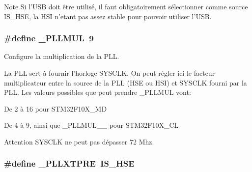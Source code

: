 \begin{DoxyNote}{Note}
Si l'U\+S\+B doit être utilisé, il faut obligatoirement sélectionner comme source I\+S\+\_\+\+H\+S\+E, la H\+S\+I n'etant pas assez stable pour pouvoir utiliser l'U\+S\+B. 
\end{DoxyNote}
\hypertarget{group__conf___c_l_o_c_k_ga60db718f30be6916848275c17fa93121}{
\subsubsection[{\+\_\+\+P\+L\+L\+M\+U\+L}]{\setlength{\rightskip}{0pt plus 5cm}\#define \+\_\+\+P\+L\+L\+M\+U\+L~9}}\label{group__conf___c_l_o_c_k_ga60db718f30be6916848275c17fa93121}


Configure la multiplication de la P\+L\+L. 

La P\+L\+L sert à fournir l'horloge S\+Y\+S\+C\+L\+K. On peut régler ici le facteur multiplicateur entre la source de la P\+L\+L (H\+S\+E ou H\+S\+I) et S\+Y\+S\+C\+L\+K fourni par la P\+L\+L. Les valeurs possibles que peut prendre \+\_\+\+P\+L\+L\+M\+U\+L vont\+:
\begin{DoxyItemize}
\item De 2 à 16 pour S\+T\+M32\+F10\+X\+\_\+\+M\+D
\item De 4 à 9, ainsi que \+\_\+\+P\+L\+L\+M\+U\+L\+\_\+\_ pour S\+T\+M32\+F10\+X\+\_\+\+C\+L
\end{DoxyItemize}

\begin{DoxyAttention}{Attention}
S\+Y\+S\+C\+L\+K ne peut pas dépasser 72 Mhz. 
\end{DoxyAttention}
\hypertarget{group__conf___c_l_o_c_k_gaa1260de2fa33a5a6d4a7be72132f3049}{
\subsubsection[{\+\_\+\+P\+L\+L\+X\+T\+P\+R\+E}]{\setlength{\rightskip}{0pt plus 5cm}\#define \+\_\+\+P\+L\+L\+X\+T\+P\+R\+E~{\bf I\+S\+\_\+\+H\+S\+E}}}\label{group__conf___c_l_o_c_k_gaa1260de2fa33a5a6d4a7be72132f3049}


